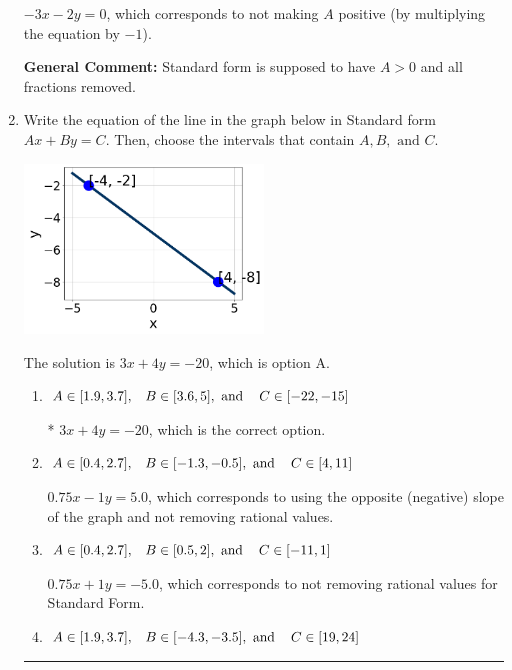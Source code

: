 \documentclass{extbook}[14pt]
\newcommand{\litem}[1]{\item #1

\rule{\textwidth}{0.4pt}}
\begin{document}
\begin{enumerate}
{\begin{enumerate}[label=\Alph*.]
 $-3x - 2y = 0$, which corresponds to not making $A$ positive (by multiplying the equation by $-1$).
\end{enumerate}

\textbf{General Comment:} Standard form is supposed to have $A > 0$ and all fractions removed.
}
\litem{
Write the equation of the line in the graph below in Standard form $Ax+By=C$. Then, choose the intervals that contain $A, B, \text{ and } C$.

\begin{center}
    \includegraphics[width=0.5\textwidth]{../Figures/linearGraphToStandardCopyC.png}
\end{center}




The solution is \( 3x + 4y = -20 \), which is option A.\begin{enumerate}[label=\Alph*.]
\item \( A \in [1.9, 3.7], \hspace{3mm} B \in [3.6, 5], \text{ and } \hspace{3mm} C \in [-22, -15] \)

* $3x + 4y = -20$, which is the correct option.
\item \( A \in [0.4, 2.7], \hspace{3mm} B \in [-1.3, -0.5], \text{ and } \hspace{3mm} C \in [4, 11] \)

 $0.75x - 1y = 5.0$, which corresponds to using the opposite (negative) slope of the graph and not removing rational values.
\item \( A \in [0.4, 2.7], \hspace{3mm} B \in [0.5, 2], \text{ and } \hspace{3mm} C \in [-11, 1] \)

 $0.75x + 1y = -5.0$, which corresponds to not removing rational values for Standard Form.
\item \( A \in [1.9, 3.7], \hspace{3mm} B \in [-4.3, -3.5], \text{ and } \hspace{3mm} C \in [19, 24] \)


\end{enumerate}}
\end{enumerate}
\end{document}
